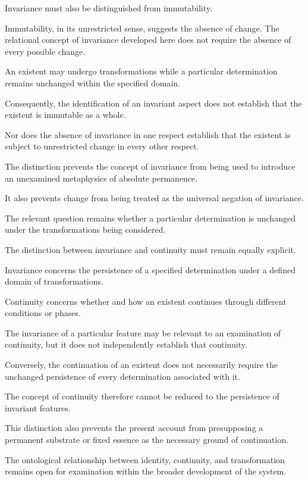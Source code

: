 Invariance must also be distinguished from
immutability.

Immutability, in its unrestricted sense,
suggests the absence of change. The relational
concept of invariance developed here does
not require the absence of every possible
change.

An existent may undergo transformations
while a particular determination remains
unchanged within the specified domain.

Consequently, the identification of an
invariant aspect does not establish that
the existent is immutable as a whole.

Nor does the absence of invariance in
one respect establish that the existent
is subject to unrestricted change in
every other respect.

The distinction prevents the concept
of invariance from being used to introduce
an unexamined metaphysics of absolute
permanence.

It also prevents change from being treated
as the universal negation of invariance.

The relevant question remains whether
a particular determination is unchanged
under the transformations being considered.


The distinction between invariance and
continuity must remain equally explicit.

Invariance concerns the persistence of
a specified determination under a defined
domain of transformations.

Continuity concerns whether and how an
existent continues through different
conditions or phases.

The invariance of a particular feature
may be relevant to an examination of
continuity, but it does not independently
establish that continuity.

Conversely, the continuation of an
existent does not necessarily require
the unchanged persistence of every
determination associated with it.

The concept of continuity therefore
cannot be reduced to the persistence
of invariant features.

This distinction also prevents the
present account from presupposing
a permanent substrate or fixed essence
as the necessary ground of continuation.

The ontological relationship between
identity, continuity, and transformation
remains open for examination within
the broader development of the system.

